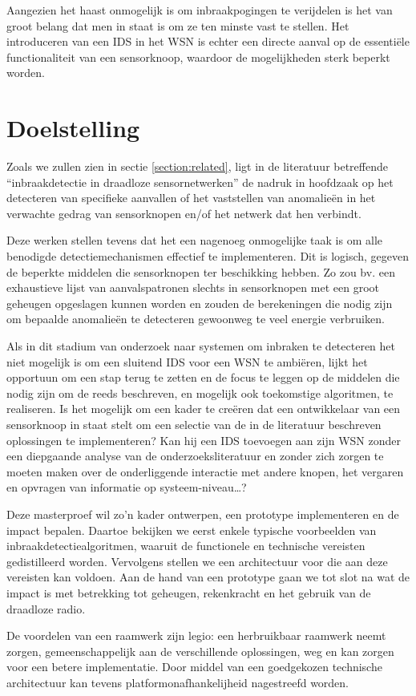 Aangezien het haast onmogelijk is om inbraakpogingen te verijdelen is het van
groot belang dat men in staat is om ze ten minste vast te stellen. Het
introduceren van een IDS in het WSN is echter een directe aanval op de
essenti\"ele functionaliteit van een sensorknoop, waardoor de mogelijkheden
sterk beperkt worden.

\section{Doelstelling}
\label{section:doelstelling}

Zoals we zullen zien in sectie \ref{section:related}, ligt in de literatuur
betreffende ``inbraakdetectie in draadloze sensornetwerken'' de nadruk in
hoofdzaak op het detecteren van specifieke aanvallen of het vaststellen van
anomalie\"en in het verwachte gedrag van sensorknopen en/of het netwerk dat hen
verbindt.

Deze werken stellen tevens dat het een nagenoeg onmogelijke taak is om alle
benodigde detectiemechanismen effectief te implementeren. Dit is logisch,
gegeven de beperkte middelen die sensorknopen ter beschikking hebben. Zo zou
bv. een exhaustieve lijst van aanvalspatronen slechts in sensorknopen met een
groot geheugen opgeslagen kunnen worden en zouden de berekeningen die nodig
zijn om bepaalde anomalie\"en te detecteren gewoonweg te veel energie
verbruiken.

Als in dit stadium van onderzoek naar systemen om inbraken te detecteren het
niet mogelijk is om een sluitend IDS voor een WSN te ambi\"eren, lijkt het
opportuun om een stap terug te zetten en de focus te leggen op de middelen die
nodig zijn om de reeds beschreven, en mogelijk ook toekomstige algoritmen, te
realiseren. Is het mogelijk om een kader te cre\"eren dat een ontwikkelaar van
een sensorknoop in staat stelt om een selectie van de in de literatuur
beschreven oplossingen te implementeren? Kan hij een IDS toevoegen aan zijn WSN
zonder een diepgaande analyse van de onderzoeksliteratuur en zonder zich zorgen
te moeten maken over de onderliggende interactie met andere knopen, het
vergaren en opvragen van informatie op systeem-niveau\dots?

Deze masterproef wil zo'n kader ontwerpen, een prototype implementeren en de
impact bepalen. Daartoe bekijken we eerst enkele typische voorbeelden van
inbraakdetectiealgoritmen, waaruit de functionele en technische vereisten
gedistilleerd worden. Vervolgens stellen we een architectuur voor die aan deze
vereisten kan voldoen. Aan de hand van een prototype gaan we tot slot na wat de
impact is met betrekking tot geheugen, rekenkracht en het gebruik van de
draadloze radio.

De voordelen van een raamwerk zijn legio: een herbruikbaar raamwerk neemt
zorgen, gemeenschappelijk aan de verschillende oplossingen, weg en kan zorgen
voor een betere implementatie. Door middel van een goedgekozen technische
architectuur kan tevens platformonafhankelijheid nagestreefd worden.
